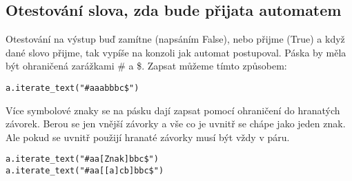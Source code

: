 \documentclass{article}
\begin{document}
\subsection{Otestování slova, zda bude přijata automatem}
Otestování na výstup buď zamítne (napsáním False), nebo přijme (True) a když dané slovo přijme,
tak vypíše na konzoli jak automat postupoval.
Páska by měla být ohraničená zarážkami \# a \$.
Zapsat můžeme tímto způsobem:
\begin{lstlisting}
a.iterate_text("#aaabbbc$")
\end{lstlisting}
Více symbolové znaky se na pásku dají zapsat pomocí ohraničení do hranatých závorek.
Berou se jen vnější závorky a vše co je uvnitř se chápe jako jeden znak.
Ale pokud se uvnitř použijí hranaté závorky musí být vždy v páru.
\begin{lstlisting}
a.iterate_text("#aa[Znak]bbc$")
a.iterate_text("#aa[[a]cb]bbc$")
\end{lstlisting}
\end{document}
